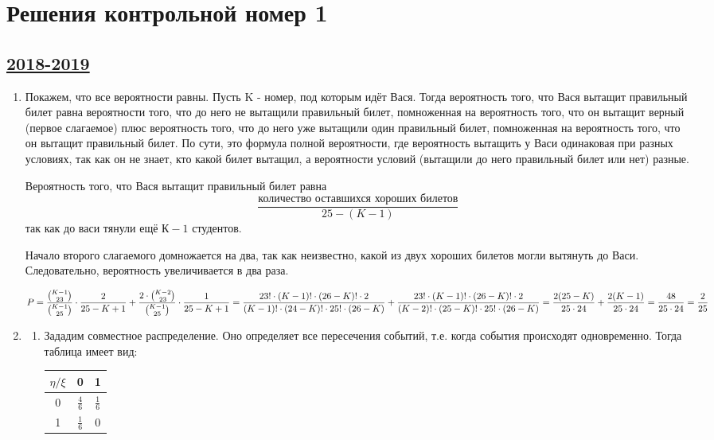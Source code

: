 \thispagestyle{empty}
\section{Решения контрольной номер 1}

\subsection[2018-2019]{\hyperref[sec:kr_01_2018_2019]{2018-2019}}
\label{sec:sol_kr_01_2018_2019}

\begin{enumerate}
	\item 
	Покажем, что все вероятности равны.
	Пусть K - номер, под которым идёт Вася. Тогда вероятность того, что Вася вытащит правильный билет равна вероятности того, что до него не вытащили правильный билет, помноженная на вероятность того, что он вытащит верный (первое слагаемое) плюс вероятность того, что до него уже вытащили один правильный билет, помноженная на вероятность того, что он вытащит правильный билет. 
	По сути, это формула полной вероятности, где вероятность вытащить у Васи одинаковая при разных условиях, так как он не знает, кто какой билет вытащил, а вероятности условий (вытащили до него правильный билет или нет) разные.
	
	Вероятность того, что Вася вытащит правильный билет равна \[ \dfrac{\text{количество оставшихся хороших билетов}}{25-(K-1)} \] так как до васи тянули ещё $ К - 1 $ студентов.
	
	Начало второго слагаемого домножается на два, так как неизвестно, какой из двух хороших билетов могли вытянуть до Васи. Следовательно, вероятность увеличивается в два раза.
	
	$ P = \dfrac{\binom{K-1}{23}}{\binom{K-1}{25}} \cdot \dfrac{2}{25-K+1} +  \dfrac{ 2 \cdot \binom{K-2}{23}}{\binom{K-1}{25}} \cdot \dfrac{1}{25-K+1} = \dfrac{23! \cdot (K-1)! \cdot (26-K)! \cdot2}{(K-1)! \cdot (24-K)! \cdot 25! \cdot (26-K)} + \\
	\dfrac{23! \cdot (K-1)! \cdot (26-K)! \cdot2}{(K-2)! \cdot (25-K)! \cdot 25! \cdot (26-K)} = \dfrac{2(25 - K)}{25 \cdot 24} + \dfrac{2(K-1)}{25 \cdot 24} = \dfrac{48}{25 \cdot 24} = \dfrac{2}{25}$
	
	
\item 
\begin{enumerate}
	
\item
Зададим совместное распределение. Оно определяет все пересечения событий, т.е. когда события происходят одновременно. Тогда таблица имеет вид:
\begin{center}
	\begin{tabular}{|c|c|c|}
		\hline
		$ \eta / \xi $ & 0 & 1\\
		\hline
		0 & $ \frac{4}{6} $ & $ \frac{1}{6} $ \\
		\hline
		1 & $ \frac{1}{6} $  & 0 \\
		\hline
		

\end{tabular}
\end{center}
\end{enumerate}
\end{enumerate}
